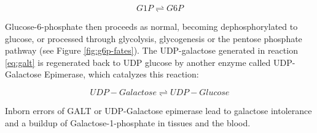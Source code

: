 \documentclass{tufte-handout}
\begin{document}
\begin{equation}
G1P \rightleftharpoons G6P
\end{equation}

Glucose-6-phosphate then proceeds as normal, becoming dephosphorylated to glucose, or processed through glycolysis, glycogenesis or the pentose phosphate pathway (see Figure \ref{fig:g6p-fates}).  The UDP-galactose generated in reaction \ref{eq:galt} is regenerated back to UDP glucose by another enzyme called UDP-Galactose Epimerase, which catalyzes this reaction:

\begin{equation}
UDP-Galactose \rightleftharpoons UDP-Glucose
\end{equation}

Inborn errors of GALT or UDP-Galactose epimerase lead to galactose intolerance and a buildup of Galactose-1-phosphate in tissues and the blood.


\end{document}
